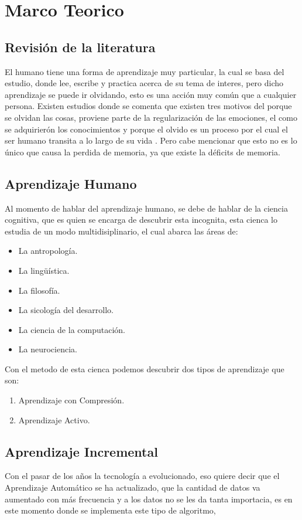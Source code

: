 \section{Marco Teorico}

    \subsection{Revisión de la literatura}
        El humano tiene una forma de aprendizaje muy particular, la cual se basa del estudio, donde lee, escribe y practica acerca de
        su tema de interes, pero dicho aprendizaje se puede ir olvidando, esto es una acción muy común que a cualquier persona.
        Existen estudios donde se comenta que existen tres motivos del porque se olvidan las cosas, proviene parte de la regularización de las emociones,
        el como se adquirierón los conocimientos y porque el olvido es un proceso por el cual el ser humano transita a lo largo de su vida \cite{Nrby2015}. Pero cabe
        mencionar que esto no es lo único que causa la perdida de memoria, ya que existe la déficits de memoria. 

    \subsection{Aprendizaje Humano}
        Al momento de hablar del aprendizaje humano, se debe de hablar de la ciencia cognitiva, que es quien se encarga de descubrir esta incognita,
        esta cienca lo estudia de un modo multidisiplinario, el cual abarca las \'areas de: 
        \begin{itemize}
            \item La antropología.
            \item La lingüística.
            \item La filosofía.
            \item La sicología del desarrollo.
            \item La ciencia de la computación. 
            \item La neurociencia.
        \end{itemize}
        Con el metodo de esta cienca podemos descubrir dos tipos de aprendizaje que son:
        \begin{enumerate}
            \item Aprendizaje con Compresi\'on.
            \item Aprendizaje Activo.
        \end{enumerate}
    \subsection{Aprendizaje Incremental}
        Con el pasar de los años la tecnología a evolucionado, eso quiere decir que el Aprendizaje Automático se ha actualizado, que la 
        cantidad de datos va aumentado con más frecuencia y a los datos no se les da tanta importacia, es en este momento donde se implementa 
        este tipo de algoritmo,  
